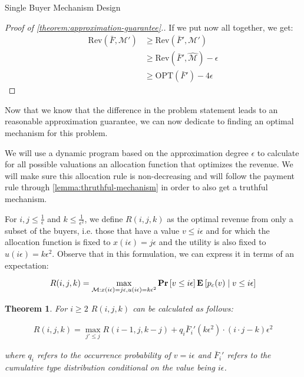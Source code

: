 \documentclass[11pt,a4paper]{article}
\newtheorem{theorem}{Theorem}
\renewcommand{\Pr}[1]{\mbox{\rm\bf Pr}\left[#1\right]}
\newcommand{\Ex}[2][]{\mbox{\rm\bf E}_{#1}\left[#2\right]}
\newcommand{\1}[1]{\mbox{\rm\bf 1}_{#1}}
\begin{document}
\begin{section}{Single Buyer Mechanism Design}
\begin{proof}[Proof of \autoref{theorem:approximation-guarantee}.]
     If we put now all together, we get:
     \begin{align*}
         \mathrm{Rev}(\bar{F}, \mathcal{M}') & \geq \mathrm{Rev}(\bar{F}', \mathcal{M}')                     \\
                                             & \geq \mathrm{Rev}(\bar{F}', \widehat{\mathcal{M}}) - \epsilon \\
                                             & \geq \mathrm{OPT}(\bar{F}') - 4\epsilon
     \end{align*}
 \end{proof}

 Now that we know that the difference in the problem statement leads to an reasonable approximation guarantee,
 we can now dedicate to finding an optimal mechanism for this problem.

 We will use a dynamic program based on the approximation degree $\epsilon$ to calculate for all possible valuations
 an allocation function that optimizes the revenue.
 We will make sure this allocation rule is non-decreasing and will follow the payment rule through \autoref{lemma:thruthful-mechanism}
 in order to also get a truthful mechanism.

 For $i,j \leq \frac{1}{\epsilon}$ and $k \leq \frac{1}{\epsilon^2}$,
 we define $R(i,j,k)$ as the optimal revenue from only a subset of the buyers, i.e. those that have a value $v \leq i \epsilon$
 and for which the allocation function is fixed to $x(i \epsilon) = j \epsilon$ and the utility is also fixed to $u(i \epsilon) = k \epsilon^2$.
 Observe that in this formulation, we can express it in terms of an expectation:

 \begin{equation}
     \label{eq:rijk}
     R(i,j,k) = \max_{\mathcal{M}: x(i\epsilon) = j\epsilon, u(i\epsilon) = k \epsilon^2} \Pr{v \leq i\epsilon}\Ex{p_c(v)\mid v \leq i \epsilon}
 \end{equation}

 \begin{theorem}
     \label{theorem:recursion-formular}
     For $i \geq 2$ $R(i,j,k)$ can be calculated as follows:

     \begin{align*}
         R(i,j,k) = \max_{j' \leq j} R(i-1, j, k - j) + q_i \bar{F}_i'(k \epsilon^2) \cdot (i\cdot j - k)\epsilon^2
     \end{align*}

     where $q_i$ refers to the occurrence probability of $v = i \epsilon$ and $\bar{F}_i'$ refers to the cumulative type distribution conditional on the value being $i\epsilon$.
 \end{theorem}


\end{section}
\end{document}
